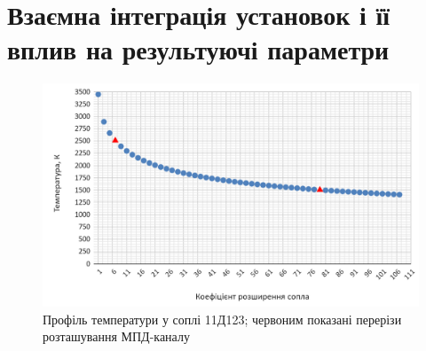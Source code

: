 


\section{Взаємна інтеграція установок і її вплив на результуючі параметри}

\begin{figure}
	\centering
	\includegraphics[width=0.7\textheight, angle=0,origin=c]{chapter_3/11D123_T(epsilon).png}
	\caption{Профіль температури у соплі 11Д123; червоним показані перерізи розташування МПД-каналу}
	\label{fig:11D123_T(epsilon)}
\end{figure}

